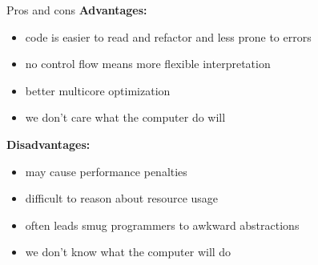 \documentclass{beamer}
\begin{document}
\begin{frame}{Pros and cons} \pause
  \textbf{Advantages:} \pause
  \begin{itemize}
  \item code is easier to read and refactor and less prone to errors \pause
  \item no control flow means more flexible interpretation \pause
  \item better multicore optimization \pause
  \item we don't care what the computer do will \pause
  \end{itemize}

  \textbf{Disadvantages:} \pause
  \begin{itemize}
  \item may cause performance penalties \pause
  \item difficult to reason about resource usage \pause
  \item often leads smug programmers to awkward abstractions \pause
  \item we don't know what the computer will do
  \end{itemize}
\end{frame}
\end{document}
